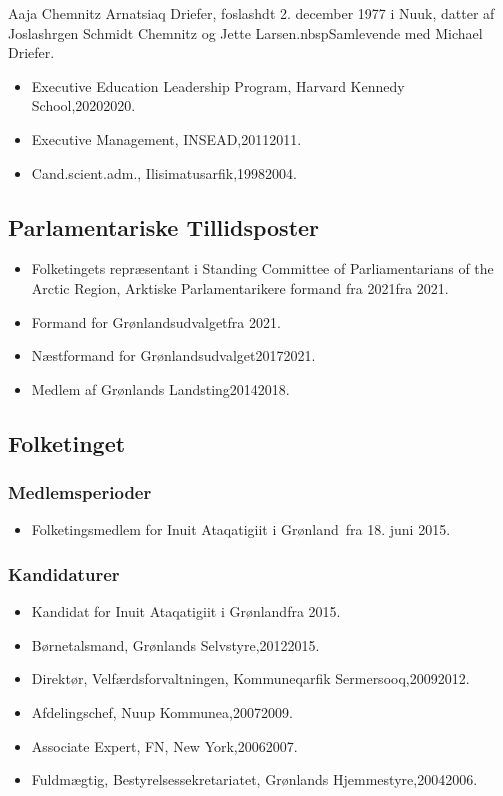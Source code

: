 \documentclass[11pt, a4paper]{awesome-cv}
\begin{document}
\makecvheader[R]
\makelettertitle
\begin{cvletter}
Aaja Chemnitz Arnatsiaq Driefer, foslashdt 2. december 1977 i Nuuk, datter af Joslashrgen Schmidt Chemnitz og Jette Larsen.nbspSamlevende med Michael Driefer.

\begin{itemize}
\item Executive Education Leadership Program, Harvard Kennedy School,20202020.
\item Executive Management, INSEAD,20112011.
\item Cand.scient.adm., Ilisimatusarfik,19982004.
\end{itemize}
\subsection*{Parlamentariske Tillidsposter}
\begin{itemize}
\item Folketingets repræsentant i Standing Committee of Parliamentarians of the Arctic Region, Arktiske Parlamentarikere formand fra 2021fra 2021.
\item Formand for Grønlandsudvalgetfra 2021.
\item Næstformand for Grønlandsudvalget20172021.
\item Medlem af Grønlands Landsting20142018.
\end{itemize}
\subsection*{Folketinget}
\subsubsection*{Medlemsperioder}
\begin{itemize}
\item Folketingsmedlem for Inuit Ataqatigiit i Grønland fra 18. juni 2015.
\end{itemize}
\subsubsection*{Kandidaturer}
\begin{itemize}
\item Kandidat for Inuit Ataqatigiit i Grønlandfra 2015.
\end{itemize}
\begin{itemize}
\item Børnetalsmand, Grønlands Selvstyre,20122015.
\item Direktør, Velfærdsforvaltningen, Kommuneqarfik Sermersooq,20092012.
\item Afdelingschef, Nuup Kommunea,20072009.
\item Associate Expert, FN, New York,20062007.
\item Fuldmægtig, Bestyrelsessekretariatet, Grønlands Hjemmestyre,20042006.
\end{itemize}
\end{cvletter}
\end{document}
